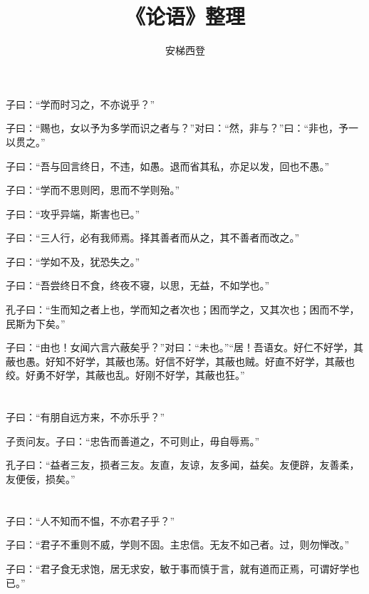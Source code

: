 \documentclass[a5paper]{ctexbook}
\title{《论语》整理}
\author{安梯西登}
\date{}
\begin{document}
    \maketitle

    \tableofcontents

    \chapter{}

    子曰：“学而时习之，不亦说乎？”

    子曰：“赐也，女以予为多学而识之者与？”对曰：“然，非与？”曰：“非也，予一以贯之。”

    子曰：“吾与回言终日，不违，如愚。退而省其私，亦足以发，回也不愚。”

    子曰：“学而不思则罔，思而不学则殆。”

    子曰：“攻乎异端，斯害也已。”

    子曰：“三人行，必有我师焉。择其善者而从之，其不善者而改之。”

    子曰：“学如不及，犹恐失之。”

    子曰：“吾尝终日不食，终夜不寝，以思，无益，不如学也。”

    孔子曰：“生而知之者上也，学而知之者次也；困而学之，又其次也；困而不学，民斯为下矣。”

    子曰：“由也！女闻六言六蔽矣乎？”对曰：“未也。”“居！吾语女。好仁不好学，其蔽也愚。好知不好学，其蔽也荡。好信不好学，其蔽也贼。好直不好学，其蔽也绞。好勇不好学，其蔽也乱。好刚不好学，其蔽也狂。”

    \chapter{}

    子曰：“有朋自远方来，不亦乐乎？”

    子贡问友。子曰：“忠告而善道之，不可则止，毋自辱焉。”

    孔子曰：“益者三友，损者三友。友直，友谅，友多闻，益矣。友便辟，友善柔，友便佞，损矣。”

    \chapter{}    子曰：“人不知而不愠，不亦君子乎？”

    子曰：“君子不重则不威，学则不固。主忠信。无友不如己者。过，则勿惮改。”

    子曰：“君子食无求饱，居无求安，敏于事而慎于言，就有道而正焉，可谓好学也已。”
\end{document}
